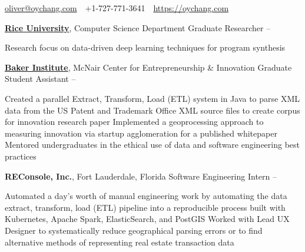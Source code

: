 \documentclass[letterpaper,MMMyyyy,nonstopmode]{simpleresumecv}
\newcommand{\CVAuthor}{Oliver Chang}
\newcommand{\CVWebpage}{https://oychang.com}
\begin{document}

\Title{\CVAuthor}

\begin{SubTitle}
\href{mailto:oliver@oychang.com}{oliver@oychang.com}
\,\SubBulletSymbol\,
+1-727-771-3641
\,\SubBulletSymbol\,
\href{\CVWebpage}
{\url{\CVWebpage}}
\end{SubTitle}

\begin{Body}




\Entry
\href{http://www.rice.edu/}{\textbf{Rice University}}, Computer Science Department
\Gap
\BulletItem Graduate Researcher
\hfill {} -- 
\begin{Detail}
\SubBulletItem Research focus on data-driven deep learning techniques for program synthesis
\end{Detail}

\Entry
\href{http://www.rice.edu/}{\textbf{Baker Institute}}, McNair Center for Entrepreneurship \& Innovation
\Gap
\BulletItem Graduate Student Assistant
\hfill {} -- 
\begin{Detail}
\SubBulletItem Created a parallel Extract, Transform, Load (ETL) system in Java to parse XML data from the US Patent and Trademark Office XML source files to create corpus for innovation research paper
\SubBulletItem Implemented a geoprocessing approach to measuring innovation via startup agglomeration for a published whitepaper
\SubBulletItem Mentored undergraduates in the ethical use of data and software engineering best practices
\end{Detail}

\Entry
\textbf{REConsole, Inc.}, Fort Lauderdale, Florida
\Gap
\BulletItem
Software Engineering Intern
\hfill
{} -- 
\begin{Detail}
\SubBulletItem Automated a day's worth of manual engineering work by automating the data extract, transform, load (ETL) pipeline into a reproducible process built with Kubernetes, Apache Spark, ElasticSearch, and PostGIS
\SubBulletItem Worked with Lead UX Designer to systematically reduce geographical parsing errors or to find alternative methods of representing real estate transaction data
\end{Detail}


\end{Body}
\end{document}
